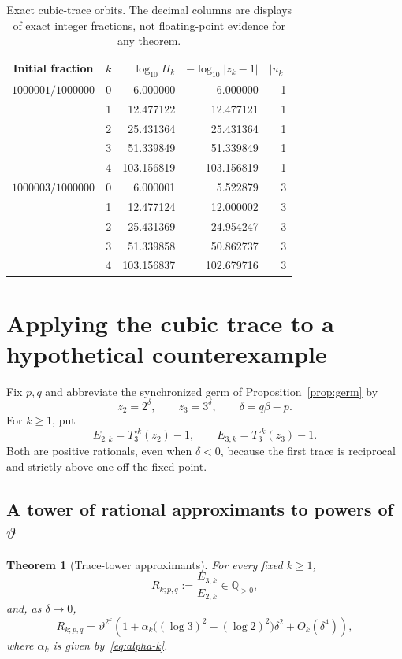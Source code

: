 \documentclass[11pt,oneside]{article}
\newtheorem{theorem}{Theorem}[section]
\theoremstyle{definition}
\theoremstyle{remark}
\newcommand{\Q}{\mathbb Q}
\newcommand{\thetaAE}{\vartheta}
\begin{document}
\begin{table}[htbp]
\centering
\small
\begin{tabular}{@{}c r r r r@{}}
\toprule
Initial fraction & \(k\) & \(\log_{10}H_k\) &
\(-\log_{10}|z_k-1|\) & \(|u_k|\)\\
\midrule
\(1000001/1000000\) &0&6.000000&6.000000&1\\
&1&12.477122&12.477121&1\\
&2&25.431364&25.431364&1\\
&3&51.339849&51.339849&1\\
&4&103.156819&103.156819&1\\
\addlinespace
\(1000003/1000000\) &0&6.000001&5.522879&3\\
&1&12.477124&12.000002&3\\
&2&25.431369&24.954247&3\\
&3&51.339858&50.862737&3\\
&4&103.156837&102.679716&3\\
\bottomrule
\end{tabular}
\caption{Exact cubic-trace orbits.  The decimal columns are displays of exact integer
fractions, not floating-point evidence for any theorem.}
\label{tab:T3-orbits}
\end{table}

\section{Applying the cubic trace to a hypothetical counterexample}
\label{sec:synchronized-T3}

Fix \(p,q\) and abbreviate the synchronized germ of Proposition~\ref{prop:germ} by
\[
 z_2=2^\delta,\qquad z_3=3^\delta,
 \qquad \delta=q\beta-p.
\]
For \(k\ge1\), put
\begin{equation}
 E_{2,k}=T_3^{\circ k}(z_2)-1,
 \qquad
 E_{3,k}=T_3^{\circ k}(z_3)-1.
 \label{eq:synchronized-errors}
\end{equation}
Both are positive rationals, even when \(\delta<0\), because the first trace is reciprocal
and strictly above one off the fixed point.

\subsection{A tower of rational approximants to powers of \texorpdfstring{$\thetaAE$}{theta}}

\begin{theorem}[Trace-tower approximants]
\label{thm:tower-approximants}
For every fixed \(k\ge1\),
\begin{equation}
 R_{k;p,q}:=\frac{E_{3,k}}{E_{2,k}}\in\Q_{>0},
 \label{eq:Rkpq}
\end{equation}
and, as \(\delta\to0\),
\begin{equation}
 R_{k;p,q}
 =\thetaAE^{2^k}
 \left(1+\alpha_k\bigl((\log3)^2-(\log2)^2\bigr)\delta^2
 +O_k(\delta^4)\right),
 \label{eq:tower-approximation}
\end{equation}
where \(\alpha_k\) is given by~\eqref{eq:alpha-k}.
\end{theorem}
\end{document}
